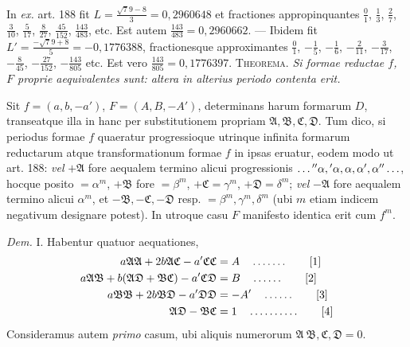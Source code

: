 In \textit{ex.} art. 188 fit $L=\frac{\surd79-{8}}{3}=0{,}2960648$ et fractiones appropinquantes $\frac{0}{1}$, $\frac{1}{3}$, $\frac{2}{7}$, $\frac{3}{10}$, $\frac{5}{17}$, $\frac{8}{27}$, $\frac{45}{152}$, $\frac{143}{483}$, etc. Est autem $\frac{143}{483}=0{,}2960662$. --- Ibidem fit $L'=\frac{-\surd79+{8}}{5}=-0{,}1776388$, fractionesque approximantes $\frac{0}{1}$, $-\frac{1}{5}$, $-\frac{1}{6}$, $-\frac{2}{11}$, $-\frac{3}{17}$, $-\frac{8}{45}$, $-\frac{27}{152}$, $-\frac{143}{805}$ etc. Est vero $\frac{143}{805}=0{,}1776397$.
\textsc{Theorema.} \textit{Si formae reductae $f$, $F$ proprie aequivalentes sunt: altera in alterius periodo contenta erit.}

Sit $f=(a,b,-a')$, $F=(A,B,-A')$, determinans harum formarum $D$, transeatque illa in hanc per substitutionem propriam $\mathfrak{A},\mathfrak{B},\mathfrak{C},\mathfrak{D}$. Tum dico, si periodus formae $f$ quaeratur progressioque utrinque infinita formarum reductarum atque transformationum formae $f$ in ipsas eruatur, eodem modo ut art. 188: \textit{vel} $+\mathfrak{A}$ fore aequalem termino alicui progressionis $\mathinner{\ldotp\ldotp\ldotp}{}''\alpha,{}'\alpha,\alpha,\alpha',\alpha''\mathinner{\ldotp\ldotp\ldotp}$, hocque posito $=\alpha^m$, $+\mathfrak{B}$ fore $=\beta^m$, $+\mathfrak{C}=\gamma^m$, $+\mathfrak{D}=\delta^m$; \textit{vel} $-\mathfrak{A}$ fore aequalem termino alicui $\alpha^m$, et $-\mathfrak{B},-\mathfrak{C},-\mathfrak{D}$ resp. $=\beta^m,\gamma^m,\delta^m$ (ubi $m$ etiam indicem negativum designare potest). In utroque casu $F$ manifesto identica erit cum $f^m$.

\textit{Dem.} I. Habentur quatuor aequationes,
\begin{align*}
a\mathfrak{A}\mathfrak{A}+2b\mathfrak{A}\mathfrak{C}-a'\mathfrak{C}\mathfrak{C}&=A \quad \mathinner{\ldotp\ldotp\ldotp\ldotp\ldotp\ldotp\ldotp} \tag*{[1]}\\
a\mathfrak{A}\mathfrak{B}+b(\mathfrak{A}\mathfrak{D}+\mathfrak{B}\mathfrak{C})-a'\mathfrak{C}\mathfrak{D}&=B \quad \mathinner{\ldotp\ldotp\ldotp\ldotp\ldotp\ldotp} \tag*{[2]}\\
a\mathfrak{B}\mathfrak{B}+2b\mathfrak{B}\mathfrak{D}-a'\mathfrak{D}\mathfrak{D}&=-A' \quad \mathinner{\ldotp\ldotp\ldotp\ldotp\ldotp\ldotp} \tag*{[3]}\\
\mathfrak{A}\mathfrak{D}-\mathfrak{B}\mathfrak{C}&=1 \quad \mathinner{\ldotp\ldotp\ldotp\ldotp\ldotp\ldotp\ldotp\ldotp\ldotp\ldotp} \tag*{[4]}
\end{align*}
Consideramus autem \textit{primo} casum, ubi aliquis numerorum $\mathfrak{A}\ \mathfrak{B},\mathfrak{C},\mathfrak{D}=0$.

